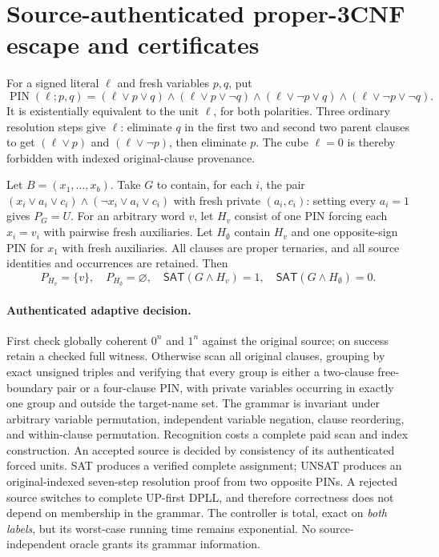 \documentclass[11pt]{article}
\newcommand{\SAT}{\mathsf{SAT}}
\begin{document}
\section{Source-authenticated proper-3CNF escape and certificates}
For a signed literal $\ell$ and fresh variables $p,q$, put
\[
\operatorname{PIN}(\ell;p,q)=
(\ell\vee p\vee q)\wedge(\ell\vee p\vee\neg q)\wedge
(\ell\vee\neg p\vee q)\wedge(\ell\vee\neg p\vee\neg q).
\]
It is existentially equivalent to the unit $\ell$, for both polarities. Three ordinary resolution steps give $\ell$: eliminate $q$ in the first two and second two parent clauses to get $(\ell\vee p)$ and $(\ell\vee\neg p)$, then eliminate $p$. The cube $\ell=0$ is thereby forbidden with indexed original-clause provenance.

Let $B=(x_1,\ldots,x_b)$. Take $G$ to contain, for each $i$, the pair
$(x_i\vee a_i\vee c_i)\wedge(\neg x_i\vee a_i\vee c_i)$ with fresh private $(a_i,c_i)$: setting every $a_i=1$ gives $P_G=U$. For an arbitrary word $v$, let $H_v$ consist of one PIN forcing each $x_i=v_i$ with pairwise fresh auxiliaries. Let $H_\emptyset$ contain $H_v$ and one opposite-sign PIN for $x_1$ with fresh auxiliaries. All clauses are proper ternaries, and all source identities and occurrences are retained. Then
\[
P_{H_v}=\{v\},\quad P_{H_\emptyset}=\varnothing,\quad
\SAT(G\wedge H_v)=1,\quad \SAT(G\wedge H_\emptyset)=0.
\]

\paragraph{Authenticated adaptive decision.}
First check globally coherent $0^n$ and $1^n$ against the original source; on success retain a checked full witness. Otherwise scan all original clauses, grouping by exact unsigned triples and verifying that every group is either a two-clause free-boundary pair or a four-clause PIN, with private variables occurring in exactly one group and outside the target-name set. The grammar is invariant under arbitrary variable permutation, independent variable negation, clause reordering, and within-clause permutation. Recognition costs a complete paid scan and index construction. An accepted source is decided by consistency of its authenticated forced units. SAT produces a verified complete assignment; UNSAT produces an original-indexed seven-step resolution proof from two opposite PINs. A rejected source switches to complete UP-first DPLL, and therefore correctness does not depend on membership in the grammar. The controller is total, exact on \emph{both labels}, but its worst-case running time remains exponential. No source-independent oracle grants its grammar information.
\end{document}
